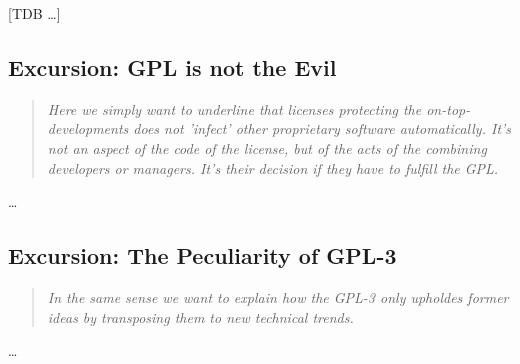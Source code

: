 %
%
%
%
%



[TDB \ldots]
\subsection{Excursion: GPL is not the Evil}
\footnotesize
\begin{quote}\itshape
Here we simply want to underline that licenses protecting the
on-top-developments does not 'infect' other proprietary software automatically.
It's not an aspect of the code of the license, but of the acts of the combining
developers or managers. It's their decision if they have to fulfill the GPL.
\end{quote}
\normalsize
\ldots

\subsection{Excursion: The Peculiarity of GPL-3}
\footnotesize
\begin{quote}\itshape
In the same sense we want to explain how the GPL-3 only upholdes former ideas by
transposing them to new technical trends.
\end{quote}
\normalsize
\ldots


%
